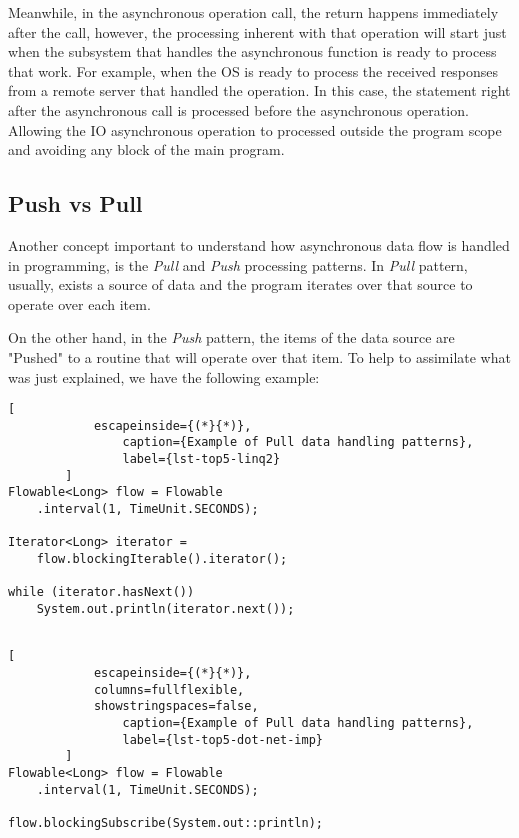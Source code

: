 	Meanwhile, in the asynchronous operation call, the return happens immediately after the call, however, the processing inherent with that operation will start just when the subsystem that handles the asynchronous function is ready to process that work. For example, when the OS is ready to process the received responses from a remote server that handled the operation.
	In this case, the statement right after the asynchronous call is processed before the asynchronous operation. Allowing the IO asynchronous operation to processed outside the program scope and avoiding any block of the main program.


	\subsection{Push vs Pull}
	Another concept important to understand how asynchronous data flow is handled in programming, is the \textit{Pull} and \textit{Push} processing patterns.
	In \textit{Pull} pattern, usually, exists a source of data and the program iterates over that source to operate over each item. 
	
	On the other hand, in the \textit{Push} pattern, the items of the data source are "Pushed" to a routine that will operate over that item.
	To help to assimilate what was just explained, we have the following example:


	\begin{center}
		\lstset{basicstyle=\scriptsize\ttfamily,frame=bottomline}
		\begin{minipage}{.48\textwidth}
		\begin{lstlisting}[
			escapeinside={(*}{*)},
				caption={Example of Pull data handling patterns},
				label={lst-top5-linq2}
		]
Flowable<Long> flow = Flowable
	.interval(1, TimeUnit.SECONDS);

Iterator<Long> iterator = 
	flow.blockingIterable().iterator();

while (iterator.hasNext()) 
	System.out.println(iterator.next());
		
		\end{lstlisting}
		\end{minipage}
		\hfill
		\begin{minipage}{.48\textwidth}
		\lstset{basicstyle=\scriptsize\ttfamily,frame=bottomline}
		\begin{lstlisting}[
			escapeinside={(*}{*)},
			columns=fullflexible,
			showstringspaces=false,
				caption={Example of Pull data handling patterns},
				label={lst-top5-dot-net-imp}
		]
Flowable<Long> flow = Flowable
	.interval(1, TimeUnit.SECONDS);

flow.blockingSubscribe(System.out::println);

		\end{lstlisting}
		\end{minipage}
	\end{center}


